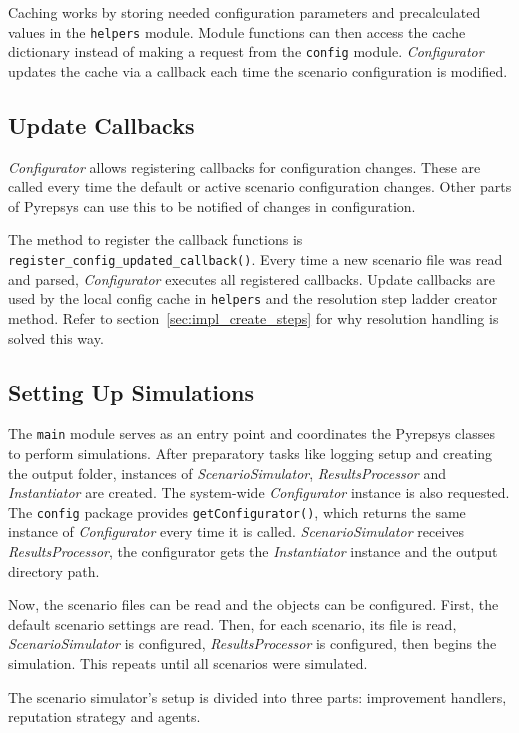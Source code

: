\documentclass[%
    ]{\PathToTumTemplate/thesis/tum_thesis}
\begin{document}
Caching works by storing needed configuration parameters and precalculated values in the \texttt{helpers} module.
Module functions can then access the cache dictionary instead of making a request from the \texttt{config} module.
\emph{Configurator} updates the cache via a callback each time the scenario configuration is modified.


\subsection{Update Callbacks}\label{sec:config_update_callbacks}
\emph{Configurator} allows registering callbacks for configuration changes.
These are called every time the default or active scenario configuration changes.
Other parts of Pyrepsys can use this to be notified of changes in configuration.

The method to register the callback functions is \lstinline{register_config_updated_callback()}.
Every time a new scenario file was read and parsed, \emph{Configurator} executes all registered callbacks.
Update callbacks are used by the local config cache in \texttt{helpers} and the resolution step ladder creator method.
Refer to section~\ref{sec:impl_create_steps} for why resolution handling is solved this way.


\subsection{Setting Up Simulations}
The \texttt{main} module serves as an entry point and coordinates the Pyrepsys classes to perform simulations.
After preparatory tasks like logging setup and creating the output folder, instances of \emph{ScenarioSimulator}, \emph{ResultsProcessor} and \emph{Instantiator} are created.
The system-wide \emph{Configurator} instance is also requested.
The \texttt{config} package provides \lstinline{getConfigurator()}, which returns the same instance of \emph{Configurator} every time it is called.
\emph{ScenarioSimulator} receives \emph{ResultsProcessor}, the configurator gets the \emph{Instantiator} instance and the output directory path.

Now, the scenario files can be read and the objects can be configured.
First, the default scenario settings are read.
Then, for each scenario, its file is read, \emph{ScenarioSimulator} is configured, \emph{ResultsProcessor} is configured, then begins the simulation.
This repeats until all scenarios were simulated.

The scenario simulator's setup is divided into three parts: improvement handlers, reputation strategy and agents.
\end{document}
